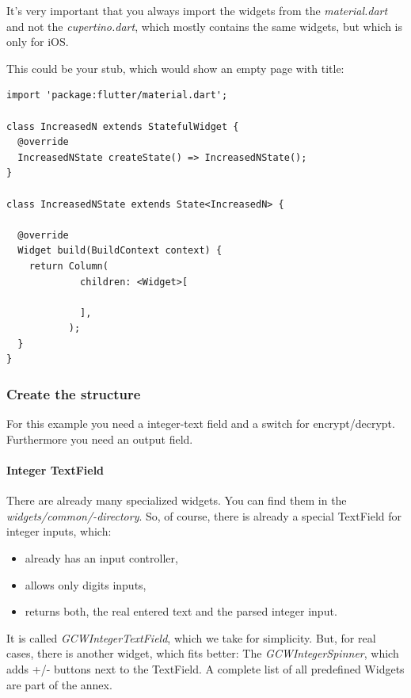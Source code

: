It's very important that you always import the widgets from the \emph{material.dart} and not the \emph{cupertino.dart}, which mostly contains the same widgets, but which is only for iOS.\par

This could be your stub, which would show an empty page with title:

\begin{lstlisting}
import 'package:flutter/material.dart';

class IncreasedN extends StatefulWidget {
  @override
  IncreasedNState createState() => IncreasedNState();
}

class IncreasedNState extends State<IncreasedN> {

  @override
  Widget build(BuildContext context) {
    return Column(
             children: <Widget>[

             ],
           );
  }
}
\end{lstlisting}
\label{fig: widgetstructure}

\subsubsection{Create the structure}
For this example you need a integer-text field and a switch for encrypt/decrypt. Furthermore you need an output field.

\paragraph{Integer TextField} There are already many specialized widgets. You can find them in the \emph{widgets/common/-directory}. So, of course, there is already a special TextField for integer inputs, which:
\begin{itemize}
    \item already has an input controller,
    \item allows only digits inputs,
    \item returns both, the real entered text and the parsed integer input.
\end{itemize}

It is called \emph{GCWIntegerTextField}, which we take for simplicity. But, for real cases, there is another widget, which fits better: The \emph{GCWIntegerSpinner}, which adds +/- buttons next to the TextField. A complete list of all predefined Widgets are part of the annex.

